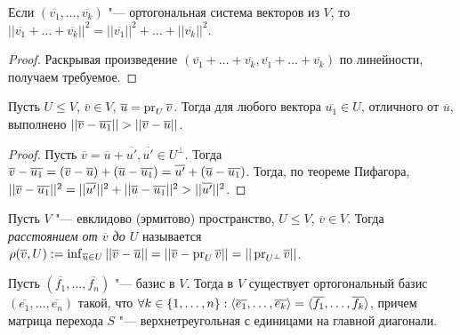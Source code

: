 \begin{proposition}
	Если $(\overline{v_1}, \dots, \overline{v_k})$ "--- ортогональная система векторов из $V$, то $||\overline{v_1} + \dots + \overline{v_k}||^2 = ||\overline{v_1}||^2 + \dots + ||\overline{v_k}||^2$.
\end{proposition}

\begin{proof}
	Раскрывая произведение $(\overline{v_1} + \dots + \overline{v_k}, \overline{v_1} + \dots + \overline{v_k})$ по линейности, получаем требуемое.
\end{proof}

\begin{proposition}
	Пусть $U \le V$, $\overline{v} \in V$, $\overline{u} = \operatorname{pr}_U{\overline{v}}$. Тогда для любого вектора $\overline{u_1} \in U$, отличного от $\overline{u}$, выполнено $||\overline{v} - \overline{u_1}|| \hm{>} ||\overline{v} - \overline{u}||$.
\end{proposition}

\begin{proof}
	Пусть $\overline{v} = \overline{u} + \overline{u'}, \overline{u'} \in U^\perp$. Тогда $\overline{v} - \overline{u_1} = (\overline{v} \hm{-} \overline{u}) + (\overline{u} - \overline{u_1}) = \overline{u'} + (\overline{u} - \overline{u_1})$. Тогда, по теореме Пифагора, $||\overline{v} - \overline{u_1}||^2 \hm{=} ||\overline{u'}||^2 + ||\overline{u} - \overline{u_1}||^2 > ||\overline{u'}||^2$.
\end{proof}

\begin{definition}
	Пусть $V$ "--- евклидово (эрмитово) пространство, $U \le V$, $\overline{v} \in V$. Тогда \textit{расстоянием от $\overline{v}$ до $U$} называется $\rho(\overline{v}, U) \hm{:=} \inf_{\overline{u} \in U}||\overline{v} - \overline{u}|| = ||\overline{v} - \pr_U{\overline{v}}|| = ||\pr_{U^\perp}\overline{v}||$. 
\end{definition}

\begin{theorem}
	Пусть $(\overline{f_1}, \dots, \overline{f_n})$ "--- базис в $V$. Тогда в $V$ существует ортогональный базис $(\overline{e_1}, \dots, \overline{e_n})$ такой, что $\forall k \hm{\in} \{1, \dots, n\}: \langle\overline{e_1}, \dots, \overline{e_k}\rangle \hm= \langle\overline{f_1}, \dots, \overline{f_k}\rangle$, причем матрица перехода $S$ "--- верхнетреугольная с единицами на главной диагонали.
\end{theorem}

